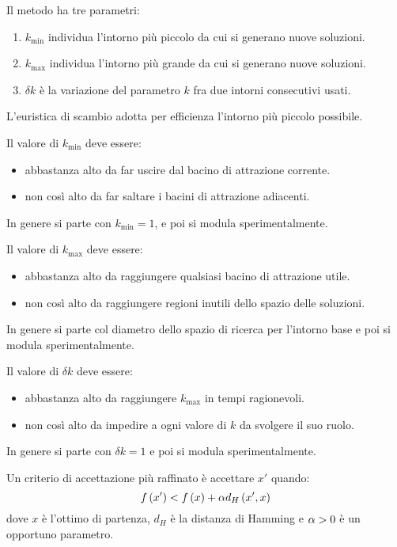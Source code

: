 \documentclass[\main/main.tex]{subfiles}
\begin{document}
\begin{multicols}{2}
\begin{definition}
    Il metodo ha tre parametri:
    \begin{enumerate}
        \item \(k_{\min}\) individua l'intorno più piccolo da cui si generano nuove soluzioni.
        \item \(k_{\max}\) individua l'intorno più grande da cui si generano nuove soluzioni.
        \item \(\delta k\) è la variazione del parametro \(k\) fra due intorni consecutivi usati.
    \end{enumerate}
    L'euristica di scambio adotta per efficienza l'intorno più piccolo possibile.
\end{definition}
\begin{observation}
    Il valore di \(k_{\min}\) deve essere:
    \begin{itemize}
        \item abbastanza alto da far uscire dal bacino di attrazione corrente.
        \item non così alto da far saltare i bacini di attrazione adiacenti.
    \end{itemize}
    In genere si parte con \(k_{\min} = 1\), e poi si modula sperimentalmente.
\end{observation}
\begin{observation}
    Il valore di \(k_{\max}\) deve essere:
    \begin{itemize}
        \item abbastanza alto da raggiungere qualsiasi bacino di attrazione utile.
        \item non così alto da raggiungere regioni inutili dello spazio delle soluzioni.
    \end{itemize}
    In genere si parte col diametro dello spazio di ricerca per l'intorno base e poi si modula sperimentalmente.
\end{observation}
\begin{observation}
    Il valore di \(\delta k\) deve essere:
    \begin{itemize}
        \item abbastanza alto da raggiungere \(k_{\max}\) in tempi ragionevoli.
        \item non così alto da impedire a ogni valore di \(k\) da svolgere il suo ruolo.
    \end{itemize}
    In genere si parte con \(\delta k = 1\) e poi si modula sperimentalmente.
\end{observation}
\begin{definition}
    Un criterio di accettazione più raffinato è accettare \(x'\) quando:
    \[
        f\left(x'\right) < f\left(x\right) + \alpha d_H \left(x', x\right)
    \]
    dove \(x\) è l'ottimo di partenza, \(d_H\) è la distanza di Hamming e \(\alpha>0\) è un opportuno parametro.
    

\end{definition}
\end{multicols}
\end{document}
